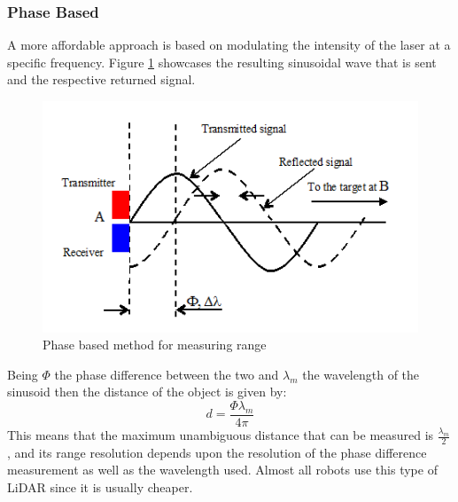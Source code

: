 \subsubsection{Phase Based}
A more affordable approach  is based on modulating the intensity of the laser at a specific frequency. Figure \ref{fig:cwlidar1} showcases the resulting sinusoidal wave that is sent and the respective returned signal. 
\begin{figure}[ht!] 
\centerline{\includegraphics [width=0.7 \textwidth]{imgs/chapter2/cwlidar1.png}}
\caption[Phase based method for measuring range]{Phase based method for measuring range \cite{cwlidar}}
\label{fig:cwlidar1}
\end{figure}

Being $\Phi$ the phase difference between the two and $\lambda_m$ the wavelength of the sinusoid then the distance of the object is given by:
\begin{equation}
    d=\frac{\Phi \lambda_m}{4 \pi}
\end{equation}
This means that the maximum unambiguous distance that can be measured is  $\frac{\lambda_m}{2}$, and its range resolution depends upon the resolution of the phase difference measurement as well as the wavelength used. Almost all robots use this type of \ac{LiDAR} since it is usually cheaper. 


